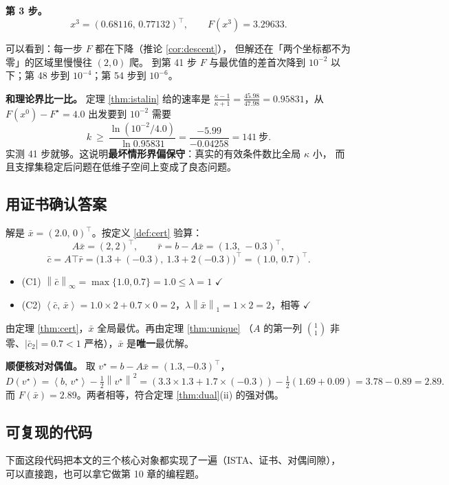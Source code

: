 \documentclass[11pt,a4paper,UTF8]{ctexart}
\theoremstyle{plain}
\theoremstyle{definition}
\theoremstyle{remark}
\newcommand{\norm}[1]{\left\lVert #1 \right\rVert}
\newcommand{\abs}[1]{\left\lvert #1 \right\rvert}
\newcommand{\inner}[2]{\left\langle #1,\, #2 \right\rangle}
\newcommand{\tp}{^{\top}}
\begin{document}
\textbf{第 3 步。}
\[
x^3=(0.68116,\,0.77132)\tp,\qquad F(x^3)=3.29633 .
\]

可以看到：每一步 $F$ 都在下降（推论 \ref{cor:descent}），
但解还在「两个坐标都不为零」的区域里慢慢往 $(2,0)$ 爬。
到第 41 步 $F$ 与最优值的差首次降到 $10^{-2}$ 以下；第 48 步到 $10^{-4}$；第 54 步到 $10^{-6}$。

\textbf{和理论界比一比。} 定理 \ref{thm:istalin} 给的速率是
$\frac{\kappa-1}{\kappa+1}=\frac{45.98}{47.98}=0.95831$，从 $F(x^0)-F^\star=4.0$ 出发要到 $10^{-2}$ 需要
\[
k\ \ge\ \frac{\ln(10^{-2}/4.0)}{\ln 0.95831}=\frac{-5.99}{-0.04258}=141\ \text{步}.
\]
实测 41 步就够。这说明\textbf{最坏情形界偏保守}：真实的有效条件数比全局 $\kappa$ 小，
而且支撑集稳定后问题在低维子空间上变成了良态问题。

\subsection{用证书确认答案}

解是 $\bar x=(2.0,\,0)\tp$。按定义 \ref{def:cert} 验算：
\[
A\bar x=(2,2)\tp,\qquad \bar r=b-A\bar x=(1.3,\,-0.3)\tp,
\]
\[
\bar c=A\top\bar r=\bigl(1.3+(-0.3),\ 1.3+2(-0.3)\bigr)\tp=(1.0,\,0.7)\tp .
\]
\begin{itemize}
\item (C1) $\norm{\bar c}_\infty=\max\{1.0,0.7\}=1.0\le\lambda=1$ \quad$\checkmark$
\item (C2) $\inner{\bar c}{\bar x}=1.0\times2+0.7\times0=2$，$\lambda\norm{\bar x}_1=1\times2=2$，相等 \quad$\checkmark$
\end{itemize}
由定理 \ref{thm:cert}，$\bar x$ 全局最优。再由定理 \ref{thm:unique}
（$A$ 的第一列 $\binom11$ 非零、$\abs{\bar c_2}=0.7<1$ 严格），$\bar x$ 是\textbf{唯一}最优解。

\textbf{顺便核对对偶值。} 取 $v^\star=b-A\bar x=(1.3,-0.3)\tp$，
\[
D(v^\star)=\inner b{v^\star}-\tfrac12\norm{v^\star}^2=(3.3\times1.3+1.7\times(-0.3))-\tfrac12(1.69+0.09)
=3.78-0.89=2.89 .
\]
而 $F(\bar x)=2.89$。两者相等，符合定理 \ref{thm:dual}(ii) 的强对偶。

\subsection{可复现的代码}

下面这段代码把本文的三个核心对象都实现了一遍（ISTA、证书、对偶间隙），
可以直接跑，也可以拿它做第 10 章的编程题。
\end{document}
